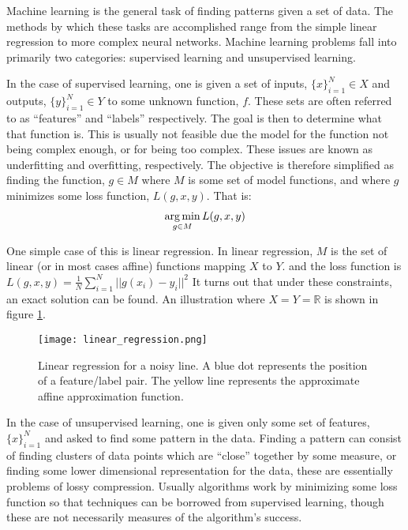 \label{sec:machine_learning}
Machine learning is the general task of finding patterns given a set of data.  The methods by which these tasks are accomplished range from the simple linear regression to more complex neural networks.  Machine learning problems fall into primarily two categories: supervised learning and unsupervised learning.  

In the case of supervised learning, one is given a set of inputs, $\{x\}_{i=1}^N\in X$ and outputs, $\{y\}_{i=1}^N\in Y$ to some unknown function, $f$.  These sets are often referred to as ``features'' and ``labels'' respectively.  The goal is then to determine what that function is.  This is usually not feasible due the model for the function not being complex enough, or for being too complex.  These issues are known as underfitting and overfitting, respectively.  The objective is therefore simplified as finding the function, $g \in M$ where $M$ is some set of model functions, and where $g$ minimizes some loss function, $L(g,x,y)$.  That is:
\begin{align}
\operatorname*{arg\,min}_{g \in M} L(g,x,y)
\end{align}

One simple case of this is linear regression.  In linear regression, $M$ is the set of linear (or in most cases affine) functions mapping $X$ to $Y$. and the loss function is $L(g,x,y) = \frac{1}{N} \sum_{i=1}^N ||g(x_i)-y_i||^2$  It turns out that under these constraints, an exact solution can be found.  An illustration where $X=Y= \mathbb{R}$ is shown in figure \ref{fig:linear_regression}.

\begin{figure}
    \centering
    \texttt{[image: linear\_regression.png]}
    \caption{Linear regression for a noisy line.  A blue dot represents the position of a feature/label pair.  The yellow line represents the approximate affine approximation function.}
    \label{fig:linear_regression}
\end{figure}

In the case of unsupervised learning, one is given only some set of features, $\{x\}_{i=1}^N$ and asked to find some pattern in the data.  Finding a pattern can consist of finding clusters of data points which are ``close'' together by some measure, or finding some lower dimensional representation for the data, these are essentially problems of lossy compression.  Usually algorithms work by minimizing some loss function so that techniques can be borrowed from supervised learning, though these are not necessarily measures of the algorithm's success.  

